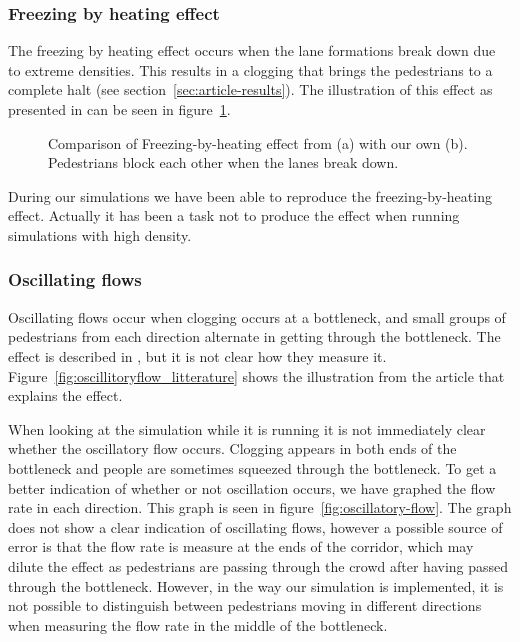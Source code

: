 \subsubsection{Freezing by heating effect}
The freezing by heating effect occurs when the lane formations break 
down due to extreme densities. This results in a clogging that brings 
the pedestrians to a complete halt (see section~\ref{sec:article-results}). 
The illustration of this effect as presented in \cite{oscil} can be seen in 
figure~\ref{fig:freezing_by_heating_litterature}.

\begin{figure}[h]
    \centering
	\resizebox{0.45\textwidth}{!}{}
    \caption[Comparison of Freezing-by-heating effect from \cite{oscil} with our own.]{Comparison of Freezing-by-heating effect from \cite{oscil} (a) with our own (b). Pedestrians block each other when the lanes break down.}
    \label{fig:freezing_by_heating_litterature}
\end{figure}

During our simulations we have been able to reproduce the freezing-by-heating 
effect. Actually it has been a task not to produce the effect when running 
simulations with high density.  

\subsubsection{Oscillating flows}
Oscillating flows occur when clogging occurs at a bottleneck, and small groups 
of pedestrians from each direction alternate in getting through the 
bottleneck. The effect is described in \cite{oscil}, but it is not clear how 
they measure it. Figure~\ref{fig:oscillitoryflow_litterature} shows the 
illustration from the article that explains the effect.

When looking at the simulation while it is running it is not immediately clear 
whether the oscillatory flow occurs. Clogging appears in both ends of the 
bottleneck and people are sometimes squeezed through the bottleneck. To get a 
better indication of whether or not oscillation occurs, we have graphed the 
flow rate in each direction. This graph is seen in 
figure~\ref{fig:oscillatory-flow}. The graph does not show a clear indication 
of oscillating flows, however a possible source of error is that the flow rate 
is measure at the ends of the corridor, which may dilute the effect as 
pedestrians are passing through the crowd after having passed through the 
bottleneck. However, in the way our simulation is implemented, it is not 
possible to distinguish between pedestrians moving in different directions 
when measuring the flow rate in the middle of the bottleneck.

